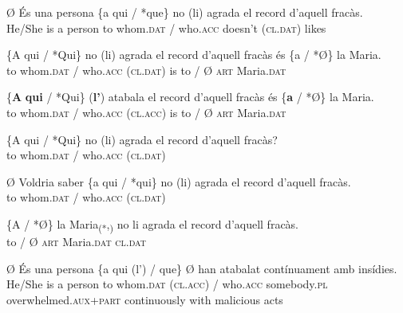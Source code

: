 \documentclass[output=paper,colorlinks,citecolor=brown,nonflat]{./langscibook}
\begin{document}
 

\ea%
 \label{ex:royo:15}
 
 \ea\label{ex:royo:15a} Ø És una persona \{a qui / *que\} no (li) agrada el record d’aquell fracàs.\\
  He/She is a person to whom.\textsc{dat} / who.\textsc{acc} doesn’t (\textsc{cl.dat}) likes\\
\glt {}
 
 \ex \label{ex:royo:15b}
 \gll  \{A qui / *Qui\} no (li) agrada el record d’aquell fracàs és \{a / *Ø\} la Maria.\\
  to whom.\textsc{dat} / who.\textsc{acc} (\textsc{cl.dat}) is to / Ø \textsc{art} Maria.\textsc{dat} \\
\glt {}
 
 \ex \label{ex:royo:15c}
 \gll \{\textbf{A} \textbf{qui} / *Qui\} (\textbf{l’}) atabala el record d’aquell fracàs és \{\textbf{a} / *Ø\} la Maria.\\
 to whom.\textsc{dat} / who.\textsc{acc} (\textsc{cl.acc}) is to / Ø \textsc{art} Maria.\textsc{dat} \\
\glt {}
 
 \ex \label{ex:royo:15d}
 \gll \{A qui / *Qui\} no (li) agrada el record d’aquell fracàs?\\
 to whom.\textsc{dat} / who.\textsc{acc} (\textsc{cl.dat}) \\
\glt {}
 
 \ex \label{ex:royo:15e}
 \gll Ø Voldria saber \{a qui / *qui\} no (li) agrada el record d’aquell fracàs.\\
  to whom.\textsc{dat} / who.\textsc{acc} (\textsc{cl.dat}) \\
\glt {}
 
 \ex \label{ex:royo:15f}
 \gll \{A / *Ø\} la Maria\textsubscript{(*},\textsubscript{)} no li agrada el record d’aquell fracàs.\\
 to / Ø \textsc{art} Maria.\textsc{dat} \textsc{cl.dat} \\
\glt {}
 
 \z
 \z

 
\ea%
 \label{ex:royo:16}
 \ea \label{ex:royo:16a}
 \gll Ø És una persona \{a qui (l’) / que\} Ø han atabalat contínuament amb insídies.\\
 He/She is a person to whom.\textsc{dat} (\textsc{cl.acc}) / who.\textsc{acc} somebody.\textsc{pl} overwhelmed.\textsc{aux}+\textsc{part} continuously with malicious acts\\
\glt {}
 
\end{document}
